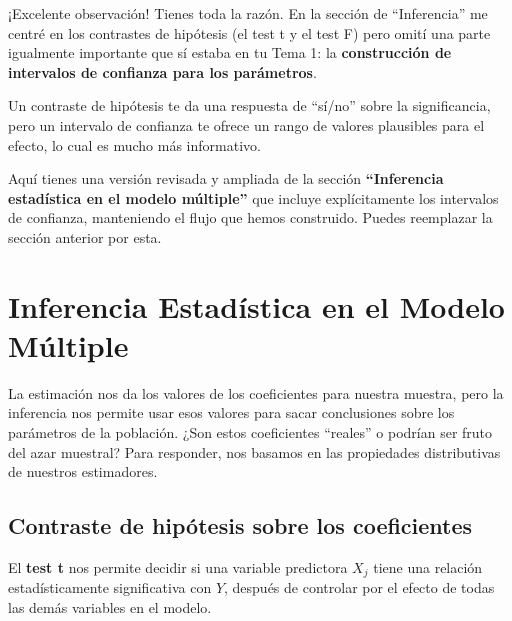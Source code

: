 \documentclass[
  letterpaper,
  DIV=11,
  numbers=noendperiod]{scrreprt}
\begin{document}
¡Excelente observación! Tienes toda la razón. En la sección de
``Inferencia'' me centré en los contrastes de hipótesis (el test t y el
test F) pero omití una parte igualmente importante que sí estaba en tu
Tema 1: la \textbf{construcción de intervalos de confianza para los
parámetros}.

Un contraste de hipótesis te da una respuesta de ``sí/no'' sobre la
significancia, pero un intervalo de confianza te ofrece un rango de
valores plausibles para el efecto, lo cual es mucho más informativo.

Aquí tienes una versión revisada y ampliada de la sección
\textbf{``Inferencia estadística en el modelo múltiple''} que incluye
explícitamente los intervalos de confianza, manteniendo el flujo que
hemos construido. Puedes reemplazar la sección anterior por esta.

\section{Inferencia Estadística en el Modelo
Múltiple}\label{inferencia-estaduxedstica-en-el-modelo-muxfaltiple}

La estimación nos da los valores de los coeficientes para nuestra
muestra, pero la inferencia nos permite usar esos valores para sacar
conclusiones sobre los parámetros de la población. ¿Son estos
coeficientes ``reales'' o podrían ser fruto del azar muestral? Para
responder, nos basamos en las propiedades distributivas de nuestros
estimadores.

\subsection{Contraste de hipótesis sobre los
coeficientes}\label{contraste-de-hipuxf3tesis-sobre-los-coeficientes}

El \textbf{test t} nos permite decidir si una variable predictora
\(X_j\) tiene una relación estadísticamente significativa con \(Y\),
después de controlar por el efecto de todas las demás variables en el
modelo.
\end{document}
